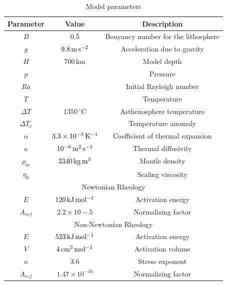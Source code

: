 \documentclass[a4paper,10pt,twocolumn]{paper}
\begin{document}
\begin{table}
\centering
\caption{Model parameters}
\label{tb:1}
\begin{tabular}{c c c}
\hline
Parameter & Value & Description \\
\hline
$B$       & 0.5   & Bouyancy number for the lithosphere \\
$g$       & $9.8\rm\,m\,s^{-2}$ & Acceleration due to gravity \\
$H$       & 700\,km & Model depth \\
$p$       &       & Pressure \\
$Ra$      &       & Initial Rayleigh number \\
$T$       &       & Temperature \\
$\Delta T$& $1350\,^{\circ}$C & Asthenosphere temperature \\
$\Delta T_{e}$&   & Temperature anomaly \\
$\alpha$  & $3.3\times10^{-5}\rm\,K^{-1}$ & Coefficient of thermal expansion \\
$\kappa$  & $10^{-6}\rm\,m^{2}\,s^{-1}$ & Thermal diffusivity \\
$\rho_{m}$& $3340\rm\,kg\,m^{3}$ & Mantle density \\
$\eta_{0}$&       & Scaling viscosity \\
\hline
\multicolumn{3}{c}{Newtonian Rheology} \\
\hline
$E$       & $120\rm\,kJ\,mol^{-1}$ & Activation energy \\
$A_{ref}$ & $2.2\times10-5$ & Normalizing factor \\
\hline
\multicolumn{3}{c}{Non-Newtonian Rheology} \\
\hline
$E$       & $523\rm\,kJ\,mol^{-1}$ & Activation energy \\
$V$       & $4\rm\,cm^{3}\,mol^{-1}$ & Activation volume \\
$n$       & 3.6 & Stress exponent \\
$A_{ref}$ & $1.47\times10^{-16}$ & Normalizing factor \\
\hline
\end{tabular}
\end{table}
\end{document}
